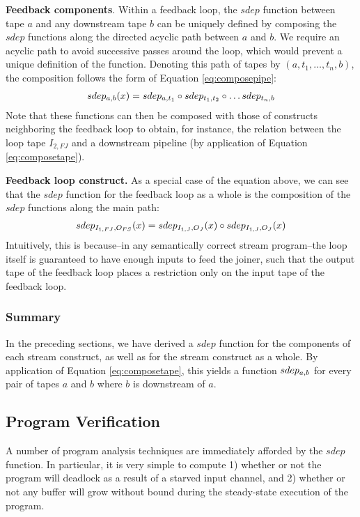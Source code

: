 {\bf Feedback components}.  Within a feedback loop, the $sdep$ function
between tape $a$ and any downstream tape $b$ can be uniquely defined
by composing the $sdep$ functions along the directed acyclic path
between $a$ and $b$.  We require an acyclic path to avoid successive
passes around the loop, which would prevent a unique definition of the
function.  Denoting this path of tapes by $(a, t_1, \dots , t_n, b)$,
the composition follows the form of Equation \ref{eq:composepipe}:
\begin{align*}
sdep_{a, b}(x) = sdep_{a, t_1} \circ sdep_{t_1, t_2} \circ \dots sdep_{t_n, b}
\end{align*}
Note that these functions can then be composed with those of
constructs neighboring the feedback loop to obtain, for instance, the
relation between the loop tape $I_{2,FJ}$ and a downstream pipeline (by
application of Equation \ref{eq:composetape}).

{\bf Feedback loop construct.}  As a special case of the equation
above, we can see that the $sdep$ function for the feedback loop as a
whole is the composition of the $sdep$ functions along the main path:
\begin{align*}
sdep_{I_{1,FJ}, O_{FS}}(x) = sdep_{I_{1,J}, O_J}(x) \circ sdep_{I_{1,J}, O_J}(x) 
\end{align*}
Intuitively, this is because--in any semantically correct stream
program--the loop itself is guaranteed to have enough inputs to feed
the joiner, such that the output tape of the feedback loop places a
restriction only on the input tape of the feedback loop.

\subsubsection{Summary}

In the preceding sections, we have derived a $sdep$ function for the
components of each stream construct, as well as for the stream
construct as a whole.  By application of Equation
\ref{eq:composetape}, this yields a function $sdep_{a, b}$ for every
pair of tapes $a$ and $b$ where $b$ is downstream of $a$.

\subsection{Program Verification}
\label{sec:prog-verif}

A number of program analysis techniques are immediately afforded by
the $sdep$ function.  In particular, it is very simple to compute 1)
whether or not the program will deadlock as a result of a starved
input channel, and 2) whether or not any buffer will grow without
bound during the steady-state execution of the program.

